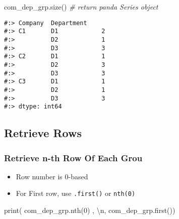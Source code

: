 \documentclass[
]{book}
\newenvironment{Shaded}{\begin{snugshade}}{\end{snugshade}}
\newcommand{\BuiltInTok}[1]{#1}
\newcommand{\CharTok}[1]{\textcolor[rgb]{0.5,0.5,0.5}{#1}}
\newcommand{\CommentTok}[1]{\textcolor[rgb]{0.37,0.37,0.37}{\textit{#1}}}
\newcommand{\DecValTok}[1]{\textcolor[rgb]{0.06,0.06,0.06}{#1}}
\newcommand{\NormalTok}[1]{#1}
\newcommand{\StringTok}[1]{\textcolor[rgb]{0.5,0.5,0.5}{#1}}
\providecommand{\tightlist}{%
  \setlength{\itemsep}{0pt}\setlength{\parskip}{0pt}}
\begin{document}
\begin{Shaded}
\begin{Highlighting}[]
\NormalTok{com\_dep\_grp.size()  }\CommentTok{\# return panda Series object}
\end{Highlighting}
\end{Shaded}

\begin{verbatim}
#:> Company  Department
#:> C1       D1            2
#:>          D2            1
#:>          D3            3
#:> C2       D1            1
#:>          D2            3
#:>          D3            3
#:> C3       D1            1
#:>          D2            1
#:>          D3            3
#:> dtype: int64
\end{verbatim}

\hypertarget{retrieve-rows}{%
\subsection{Retrieve Rows}\label{retrieve-rows}}

\hypertarget{retrieve-n-th-row-of-each-grou}{%
\subsubsection{Retrieve n-th Row Of Each Grou}\label{retrieve-n-th-row-of-each-grou}}

\begin{itemize}
\tightlist
\item
  Row number is 0-based\\
\item
  For First row, use \texttt{.first()} or \texttt{nth(0)}
\end{itemize}

\begin{Shaded}
\begin{Highlighting}[]
\BuiltInTok{print}\NormalTok{( com\_dep\_grp.nth(}\DecValTok{0}\NormalTok{)  , }\StringTok{\textquotesingle{}}\CharTok{\textbackslash{}n}\StringTok{\textquotesingle{}}\NormalTok{,}
\NormalTok{       com\_dep\_grp.first())}
\end{Highlighting}
\end{Shaded}
\end{document}
